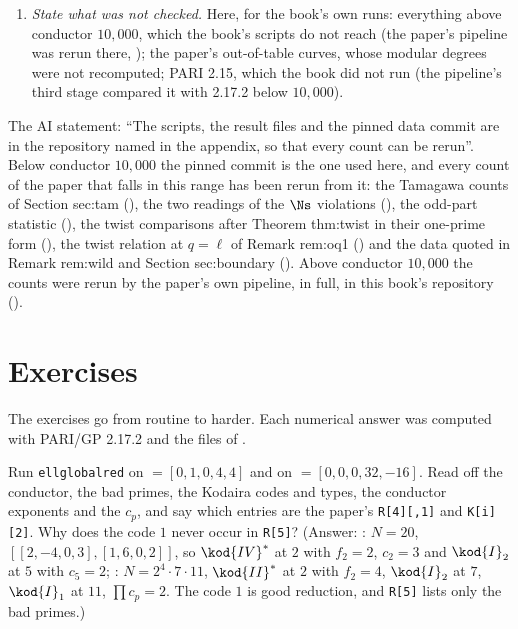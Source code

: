 \begin{sloppypar}
\begin{convention}
\begin{enumerate}[label=(\arabic*)]
\texttt{galrep}; PARI's Euler factors against Lemma lem:euler; \texttt{ellglobalred} against \texttt{curvedata}; optimality flags against \texttt{degphi}.
\item \emph{State what was not checked.} Here, for the book's own runs: everything above conductor $10{,}000$, which the book's scripts do not reach
(the paper's pipeline was rerun there, ); the paper's out-of-table curves, whose modular degrees were not
recomputed; PARI 2.15, which the book did not run (the pipeline's third stage compared it with 2.17.2 below $10{,}000$).
\end{enumerate}
\end{convention}

\begin{paperlink}\label{pl:computation:reproducibility}
The AI statement: ``The scripts, the result files and the pinned data commit are in the repository named in the appendix, so that every count
can be rerun''. Below conductor $10{,}000$ the pinned commit is the one used here, and every count of the paper that falls in this range has been
rerun from it: the Tamagawa counts of Section sec:tam (), the two readings of the $\Ns$ violations
(), the odd-part statistic (), the twist comparisons after Theorem thm:twist in their one-prime form
(), the twist relation at $q=\ell$ of Remark rem:oq1 () and the data quoted in Remark
rem:wild and Section sec:boundary (). Above conductor $10{,}000$ the counts were rerun by the
paper's own pipeline, in full, in this book's repository ().
\end{paperlink}
\section{Exercises}\label{sec:computation:exercises}

The exercises go from routine to harder. Each numerical answer was computed with PARI/GP 2.17.2 and the files of .

\begin{exercise}\label{exer:computation:globalred}
Run \texttt{ellglobalred} on  $=[0,1,0,4,4]$ and on  $=[0,0,0,32,-16]$. Read off the conductor, the bad primes, the Kodaira codes and
types, the conductor exponents and the $c_p$, and say which entries are the paper's \texttt{R[4][,1]} and \texttt{K[i][2]}. Why does the code $1$ never
occur in \texttt{R[5]}? (Answer: : $N=20$, $[[2,-4,0,3],[1,6,0,2]]$, so $\kod{IV}^*$ at $2$ with $f_2=2$, $c_2=3$ and $\kod{I}_2$ at $5$ with $c_5=2$;
: $N=2^4\cdot7\cdot11$, $\kod{II}^*$ at $2$ with $f_2=4$, $\kod{I}_2$ at $7$, $\kod{I}_1$ at $11$, $\prod c_p=2$. The code $1$ is good reduction, and
\texttt{R[5]} lists only the bad primes.)
\end{exercise}


\end{sloppypar}

